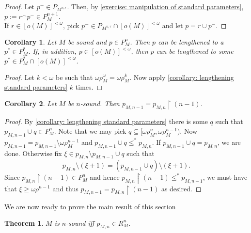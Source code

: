 \documentclass[12pt,a4paper]{article}
\theoremstyle{nicestyle}
\newtheorem{theorem}{Theorem}[subsection]
\newtheorem{corollary}{Corollary}[subsection]
\begin{document}
  \begin{proof}
    Let $p^{-} \in P_{M^{n, r}}$. Then, by \autoref{exercise:
      manipulation of standard parameters},
    $p := r ^{\frown} p^{-} \in P^{n+1}_{M}$. \\
    If $r \in [o(M)]^{< \omega}$, pick
    $p^{-} \in P_{M^{n, r}} \cap [o(M)]^{< \omega}$ and let
    $p = r \cup p^{-}$.
  \end{proof}

  \begin{corollary}
    Let $M$ be sound and $p \in P^{n}_{M}$. Then $p$ can be lengthened
    to a $p^{*} \in P^{*}_{M}$. If, in addition,
    $p \in [o(M)]^{<\omega}$, then $p$ can be lengthened to some
    $p^{*} \in P^{*}_{M} \cap [o(M)]^{<\omega}$.
  \end{corollary}

  \begin{proof}
    Let $k < \omega$ be such that
    $\omega\rho_{M}^{\omega} = \omega \rho_{M}^{k}$. Now apply
    \autoref{corollary: lengthening standard parameters} $k$
    times.
  \end{proof}

  \begin{corollary}
    Let $M$ be $n$-sound. Then
    $p_{M, n-1} = p_{M,n} \restriction (n-1)$.
  \end{corollary}

  \begin{proof}
    By \autoref{corollary: lengthening standard parameters} there is
    some $q$ such that $p_{M, n-1} \cup q \in P^{n}_{M}$. Note that we
    may pick $q \subseteq [\omega\rho^{n}_{M},
    \omega\rho^{n-1}_{M})$. Now
    $p_{M, n-1} = p_{M, n-1} \setminus \omega\rho^{n-1}_{M}$ and
    $p_{M, n-1} \cup q \le^{*} p_{M,n}$. If
    $p_{M, n-1} \cup q = p_{M,n}$, we are done. Otherwise fix
    $\xi \in p_{M,n} \setminus p_{M, n-1} \cup q$ such that
    \[
      p_{M,n} \setminus (\xi + 1) = (p_{M, n-1} \cup q) \setminus (\xi
      + 1).
    \]
    Since $p_{M,n} \restriction (n-1) \in P^{n}_{M}$ and hence
    $p_{M,n} \restriction (n-1) \le^{*} p_{M, n-1}$, we must have that
    $\xi \ge \omega\rho^{n-1}$ and thus
    $p_{M, n-1} = p_{M,n} \restriction (n-1)$ as desired.
  \end{proof}
  
  We are now ready to prove the main result of this section

  \begin{theorem} \label{theorem: characterization of n-soundness}
    $M$ is $n$-sound iff $p_{M,n} \in R^{n}_{M}$.
  \end{theorem}
\end{document}

